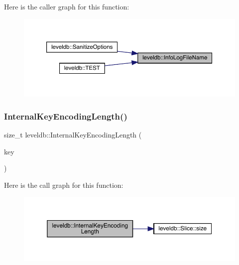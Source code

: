 Here is the caller graph for this function\+:
\nopagebreak
\begin{figure}[H]
\begin{center}
\leavevmode
\includegraphics[width=350pt]{namespaceleveldb_ac40453ca7f9c0bd723873ffe32dc12a2_icgraph}
\end{center}
\end{figure}
\mbox{\label{namespaceleveldb_a8406e76939e7e97465acf293f1585581}} 
\subsubsection{\texorpdfstring{InternalKeyEncodingLength()}{InternalKeyEncodingLength()}}
{\footnotesize\ttfamily size\+\_\+t leveldb\+::\+Internal\+Key\+Encoding\+Length (\begin{DoxyParamCaption}\item[{const \mbox{\hyperlink{structleveldb_1_1_parsed_internal_key}{Parsed\+Internal\+Key}} \&}]{key }\end{DoxyParamCaption})\hspace{0.3cm}{\ttfamily [inline]}}

Here is the call graph for this function\+:
\nopagebreak
\begin{figure}[H]
\begin{center}
\leavevmode
\includegraphics[width=350pt]{namespaceleveldb_a8406e76939e7e97465acf293f1585581_cgraph}
\end{center}
\end{figure}
\mbox{\label{namespaceleveldb_a9f772d88ab2d47dec0d68e5eb85c579e}} 
